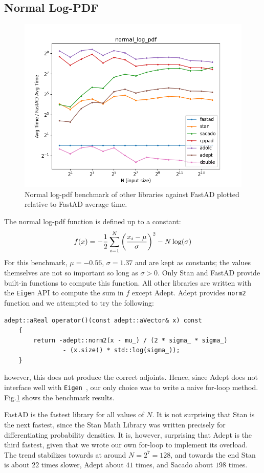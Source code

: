 \subsection{Normal Log-PDF}

\begin{figure}[t]
    \centering
    \includegraphics[width=\textwidth]{figs/normal_log_pdf_fig.png}
    \caption{%
        Normal log-pdf benchmark of other libraries against FastAD 
        plotted relative to FastAD average time.
    }\label{fig:normal_log_pdf}
\end{figure}

The normal log-pdf function is defined up to a constant:
\[
    f(x) = -\frac{1}{2} \sum\limits_{i=1}^N \left(\frac{x_i - \mu}{\sigma}\right)^2 
           -N\log(\sigma)
\]
For this benchmark, $\mu = -0.56,\,\sigma = 1.37$ and are kept as constants;
the values themselves are not so important so long as $\sigma > 0$.
Only Stan and FastAD provide built-in functions to compute this function.
All other libraries are written with the \verb|Eigen| API to compute the sum in $f$ except Adept.
Adept provides \verb|norm2| function and we attempted to try the following:
\begin{lstlisting}[style=customcpp]
    adept::aReal operator()(const adept::aVector& x) const
    {
        return -adept::norm2(x - mu_) / (2 * sigma_ * sigma_) 
                - (x.size() * std::log(sigma_));
    }
\end{lstlisting}
however, this does not produce the correct adjoints.
Hence, since Adept does not interface well with \verb|Eigen|~\cite{hogan:2014}, 
our only choice was to write a naive for-loop method.
Fig.\ref{fig:normal_log_pdf} shows the benchmark results.

FastAD is the fastest library for all values of $N$.
It is not surprising that Stan is the next fastest, 
since the Stan Math Library was written precisely for differentiating probability densities.
It is, however, surprising that Adept is the third fastest,
given that we wrote our own for-loop to implement its overload.
The trend stabilizes towards at around $N=2^{7}=128$,
and towards the end
Stan is about $ 22$ times slower,
Adept about $ 41$ times,
and Sacado about $ 198$ times.
